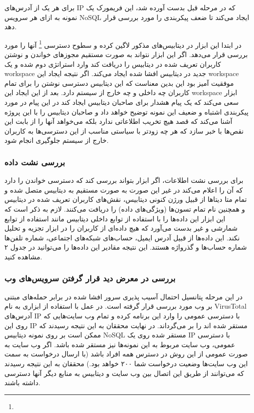 \documentclass[10pt, a4paper]{article}
\begin{document}
برای هر یک از آدرس‌های IP که در مرحله قبل بدست آورده شد، این فریمورک یک نمونه به
ازای هر سرویس NoSQL ایجاد می‌کند تا ضعف پیکربندی را مورد بررسی قرار دهد.

در ابتدا این ابزار در دیتابیس‌های مذکور لاگین کرده و سطوح دسترسی
\footnote{} آنها را مورد بررسی قرار می‌دهد. اگر این ابزار
نتواند به صورت مستقیم مجوز‌های خواندن و نوشتن کاربران تعریف شده در دیتابیس را
دریافت کند وارد استراتژی دوم شده و یک workspace جدید در دیتابیس افشا شده ایجاد
می‌کند. اگر نتیجه ایجاد این workspace موفقیت آمیز بود این بدین معناست که این
دیتابیس دسترسی نوشتن را برای تمام کاربران چه داخلی و چه خارج از سیستم دارد. بعد
از این ایجاد این workspace ابزار سعی می‌کند که یک پیام هشدار برای صاحبان دیتابیس
ایجاد کند در این پیام در مورد پیکربندی اشتباه و ضعیف این نمونه توضیح خواهد داد و
صاحبان دیتابیس را با این پروژه آشنا می‌کند که قصد هیچ تخریب اطلاعاتی ندارد بلکه
می‌خواهد آنها را از بابت این نقص‌ها با خبر سازد که هر چه زودتر با سیاستی مناسب
از این دسترسی‌ها به کاربران خارج از سیستم جلوگیری انجام شود.

\subsubsection*{بررسی نشت داده}

برای بررسی نشت اطلاعات، اگر ابزار بتواند بررسی کند که دسترسی خواندن را دارد که
آن را اعلام می‌کند در غیر این صورت به صورت مستقیم به دیتابیس متصل شده و تمام متا
دیتا‌ها از قبیل ورژن کنونی دیتابیس، نقش‌های کاربران تعریف شده در دیتابیس و
همچنین نام تمام تسون‌ها (ویژگی‌های داده) را دریافت می‌کنند. لازم به ذکر است که
این ابزار این داده‌ها را با استفاده از توابع داخلی دیتابیس مانند استفاده از
 توابع شمارشی و غیر بدست می‌آورد که هیچ داده‌ای از کاربران
را در ابزار تجزیه و تحلیل نکند. این داده‌ها از قبیل آدرس ایمیل، حساب‌های
شبکه‌های اجتماعی، شماره تلفن‌ها شماره حساب‌ها و گذرواژه هستند. این نتیجه مقادیر
این داده‌ها را می‌توانید در جدول ۲ مشاهده کنید.

\subsubsection*{بررسی در معرض دید قرار گرفتن سرویس‌های وب}

در این مرحله پتانسیل احتمال آسیب پذیری سرور افشا شده در برابر حمله‌های مبتنی بر
وب مورد بررسی قرار گرفته است. در عمل با استفاده از ابزاری به نام VirusTotal
آدرس‌های IP با دسترسی عمومی را وارد این برنامه کرده و تمام وب سایت‌هایی که روی
این IP مستقر شده اند را بر می‌گرداند. در نهایت محققان به این نتیجه رسیدند که
ممکن است بر روی نمونه دیتابیس NoSQL مستقر شده روی یک IP با دسترسی عمومی، وب
سایت‌ مربوط به این نمونه‌ها نیز مستقر شده باشد. اگر وب سایت به صورت عمومی از این
روش در دسترس همه افراد باشد (با ارسال درخواست به سمت این وب سایت‌ها وضعیت
درخواست شما ۲۰۰ خواهد بود.) محققان به این نتیجه رسیدند که می‌توانند از طریق این
اتصال بین وب سایت و دیتابیس به منابع دیگر آنها دسترسی داشته باشند.
\end{document}
